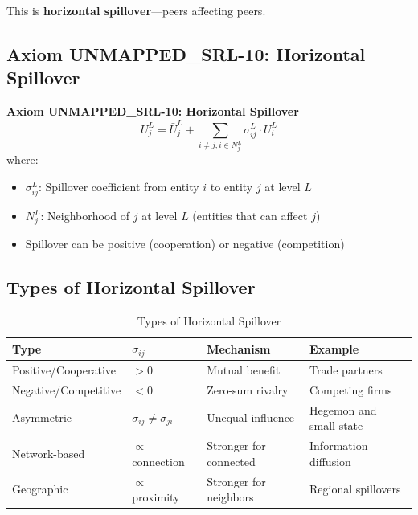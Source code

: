 This is \textbf{horizontal spillover}---peers affecting peers.

\subsection{Axiom UNMAPPED_SRL-10: Horizontal Spillover}

\begin{tcolorbox}[colback=gray!5!white, colframe=gray!75!black]
\textbf{Axiom UNMAPPED_SRL-10: Horizontal Spillover}
\begin{equation}
\boxed{
U^L_j = \bar{U}^L_j + \sum_{i \neq j, i \in N^L_j} \sigma^L_{ij} \cdot U^L_i
}
\end{equation}
where:
\begin{itemize}
\item $\sigma^L_{ij}$: Spillover coefficient from entity $i$ to entity $j$ at level $L$
\item $N^L_j$: Neighborhood of $j$ at level $L$ (entities that can affect $j$)
\item Spillover can be positive (cooperation) or negative (competition)
\end{itemize}
\end{tcolorbox}

\subsection{Types of Horizontal Spillover}

\begin{table}[htbp]
\centering
\caption{Types of Horizontal Spillover}
\label{tab:aaa-spillover-types}
\renewcommand{\arraystretch}{1.3}
\begin{tabular}{@{}llll@{}}
\toprule
\textbf{Type} & \textbf{$\sigma_{ij}$} & \textbf{Mechanism} & \textbf{Example} \\
\midrule
Positive/Cooperative & $> 0$ & Mutual benefit & Trade partners \\
Negative/Competitive & $< 0$ & Zero-sum rivalry & Competing firms \\
Asymmetric & $\sigma_{ij} \neq \sigma_{ji}$ & Unequal influence & Hegemon and small state \\
Network-based & $\propto$ connection & Stronger for connected & Information diffusion \\
Geographic & $\propto$ proximity & Stronger for neighbors & Regional spillovers \\
\bottomrule
\end{tabular}
\end{table}

